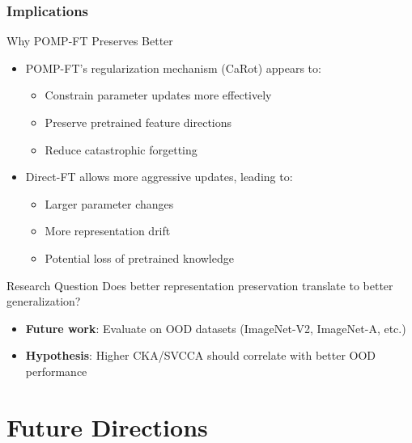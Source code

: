 \documentclass[aspectratio=1610, fontsize=8pt]{beamer}
\begin{document}
\begin{frame}
    \frametitle{Implications}
    \begin{block}{Why POMP-FT Preserves Better}
        \begin{itemize}
            \item POMP-FT's regularization mechanism (CaRot) appears to:
            \begin{itemize}
                \item Constrain parameter updates more effectively
                \item Preserve pretrained feature directions
                \item Reduce catastrophic forgetting
            \end{itemize}
            \item Direct-FT allows more aggressive updates, leading to:
            \begin{itemize}
                \item Larger parameter changes
                \item More representation drift
                \item Potential loss of pretrained knowledge
            \end{itemize}
        \end{itemize}
    \end{block}
    
    \vspace{0.3cm}
    \begin{alertblock}{Research Question}
        Does better representation preservation translate to better generalization?
        \begin{itemize}
            \item \textbf{Future work}: Evaluate on OOD datasets (ImageNet-V2, ImageNet-A, etc.)
            \item \textbf{Hypothesis}: Higher CKA/SVCCA should correlate with better OOD performance
        \end{itemize}
    \end{alertblock}
\end{frame}

\section{Future Directions}
\end{document}
